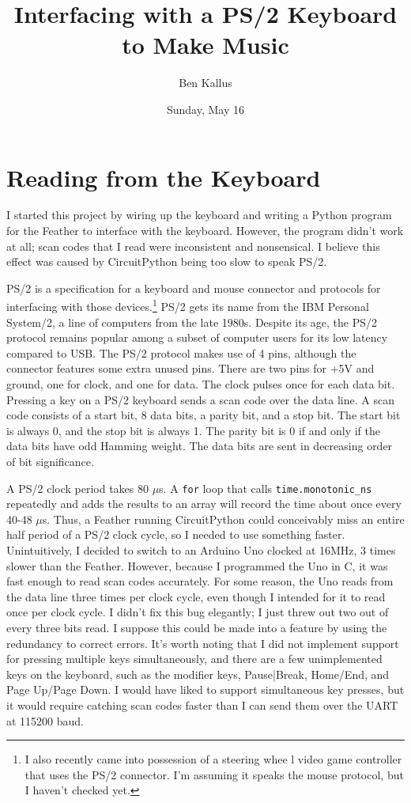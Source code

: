 \documentclass[12pt]{article}
\author{Ben Kallus}
\date{Sunday, May 16}
\title{Interfacing with a PS/2 Keyboard to Make Music}
\begin{document}
\maketitle

\section*{Reading from the Keyboard}

    I started this project by wiring up the keyboard and writing a Python program for the Feather to interface with the keyboard.
    However, the program didn't work at all; scan codes that I read were inconsistent and nonsensical.
    I believe this effect was caused by CircuitPython being too slow to speak PS/2.

    PS/2 is a specification for a keyboard and mouse connector and protocols for interfacing with those devices.\footnote{I also recently came into possession of a steering whee
l video game controller that uses the PS/2 connector. I'm assuming it speaks the mouse protocol, but I haven't checked yet.}
    PS/2 gets its name from the IBM Personal System/2, a line of computers from the late 1980s.
    Despite its age, the PS/2 protocol remains popular among a subset of computer users for its low latency compared to USB.
    The PS/2 protocol makes use of 4 pins, although the connector features some extra unused pins.
    There are two pins for +5V and ground, one for clock, and one for data.
    The clock pulses once for each data bit.
    Pressing a key on a PS/2 keyboard sends a scan code over the data line.
    A scan code consists of a start bit, 8 data bits, a parity bit, and a stop bit.
    The start bit is always 0, and the stop bit is always 1.
    The parity bit is 0 if and only if the data bits have odd Hamming weight.
    The data bits are sent in decreasing order of bit significance.

    A PS/2 clock period takes 80 $\mu$s.
    A \texttt{for} loop that calls \texttt{time.monotonic\_ns} repeatedly and adds the results to an array will record the time about once every 40-48 $\mu$s.
    Thus, a Feather running CircuitPython could conceivably miss an entire half period of a PS/2 clock cycle, so I needed to use something faster.
    Unintuitively, I decided to switch to an Arduino Uno clocked at 16MHz, 3 times slower than the Feather.
    However, because I programmed the Uno in C, it was fast enough to read scan codes accurately.
    For some reason, the Uno reads from the data line three times per clock cycle, even though I intended for it to read once per clock cycle.
    I didn't fix this bug elegantly; I just threw out two out of every three bits read.
    I suppose this could be made into a feature by using the redundancy to correct errors.
    It's worth noting that I did not implement support for pressing multiple keys simultaneously, and there are a few unimplemented keys on the keyboard, such as the modifier keys, Pause|Break, Home/End, and Page Up/Page Down.
    I would have liked to support simultaneous key presses, but it would require catching scan codes faster than I can send them over the UART at 115200 baud.
\end{document}
